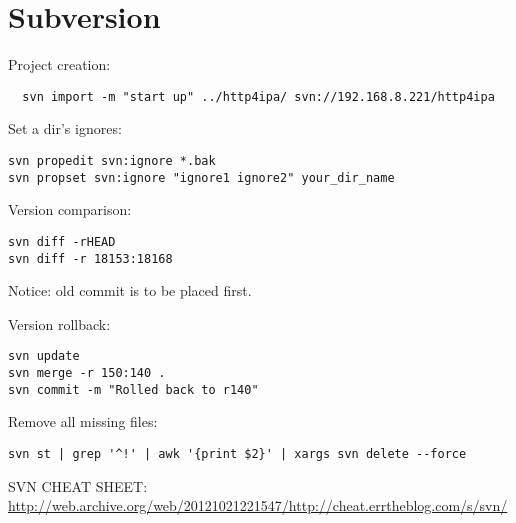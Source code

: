 
\section{Subversion}

Project creation:
\begin{verbatim}
  svn import -m "start up" ../http4ipa/ svn://192.168.8.221/http4ipa
\end{verbatim}

Set a dir's ignores:
\begin{verbatim}
svn propedit svn:ignore *.bak
svn propset svn:ignore "ignore1 ignore2" your_dir_name
\end{verbatim}

Version comparison:
\begin{verbatim}
svn diff -rHEAD
svn diff -r 18153:18168
\end{verbatim}
Notice: old commit is to be placed first.

Version rollback:
\begin{verbatim}
svn update
svn merge -r 150:140 .
svn commit -m "Rolled back to r140"
\end{verbatim}

Remove all missing files:
\begin{verbatim}
svn st | grep '^!' | awk '{print $2}' | xargs svn delete --force
\end{verbatim}

SVN CHEAT SHEET:
\url{http://web.archive.org/web/20121021221547/http://cheat.errtheblog.com/s/svn/}



















